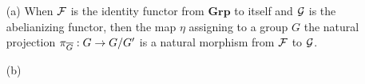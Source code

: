 \begin{exmp}
    \begin{enumerate}
        \item[(a)]
        {
            When ${\mathcal{F}}$ is the identity functor from $\textbf{Grp}$ to itself and ${\mathcal{G}}$ is the abelianizing functor, then the map $\eta$ assigning to a group $G$ the natural projection $\pi_{\overline{G}}: G\rightarrow G/G'$ is a natural morphism from ${\mathcal{F}}$ to ${\mathcal{G}}$.
        }
        \item[(b)]
        {

        }
    \end{enumerate}
\end{exmp}